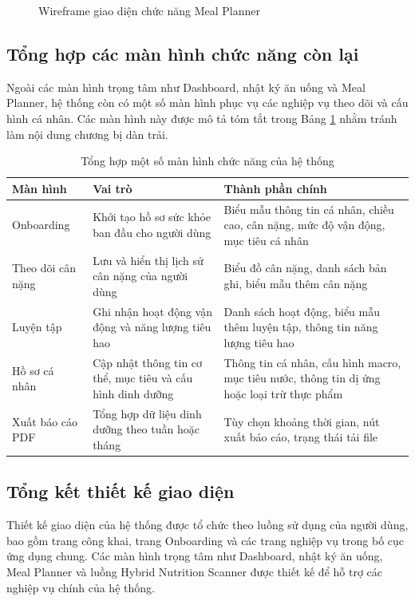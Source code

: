 \documentclass[12pt, a4paper]{report}
\begin{document}
\begin{figure}[htbp]
{\begin{tikzpicture}
    \end{tikzpicture}
    }%
    \caption{Wireframe giao diện chức năng Meal Planner}
    \label{fig:meal_planner_ui}
\end{figure}

\subsection{Tổng hợp các màn hình chức năng còn lại}Ngoài các màn hình trọng tâm như Dashboard, nhật ký ăn uống và Meal Planner, hệ thống còn có một số màn hình phục vụ các nghiệp vụ theo dõi và cấu hình cá nhân. Các màn hình này được mô tả tóm tắt trong Bảng \ref{tab:man_hinh_chuc_nang} nhằm tránh làm nội dung chương bị dàn trải.

\begin{table}[htbp]
\centering
\caption{Tổng hợp một số màn hình chức năng của hệ thống}
\label{tab:man_hinh_chuc_nang}
\begin{tabular}{|>{\raggedright\arraybackslash}p{4cm}|>{\raggedright\arraybackslash}p{4cm}|p{7cm}|}
\hline
\textbf{Màn hình} & \textbf{Vai trò} & \textbf{Thành phần chính} \\
\hline
Onboarding & Khởi tạo hồ sơ sức khỏe ban đầu cho người dùng & Biểu mẫu thông tin cá nhân, chiều cao, cân nặng, mức độ vận động, mục tiêu cá nhân \\
\hline
Theo dõi cân nặng & Lưu và hiển thị lịch sử cân nặng của người dùng & Biểu đồ cân nặng, danh sách bản ghi, biểu mẫu thêm cân nặng \\
\hline
Luyện tập & Ghi nhận hoạt động vận động và năng lượng tiêu hao & Danh sách hoạt động, biểu mẫu thêm luyện tập, thông tin năng lượng tiêu hao \\
\hline
Hồ sơ cá nhân & Cập nhật thông tin cơ thể, mục tiêu và cấu hình dinh dưỡng & Thông tin cá nhân, cấu hình macro, mục tiêu nước, thông tin dị ứng hoặc loại trừ thực phẩm \\
\hline
Xuất báo cáo PDF & Tổng hợp dữ liệu dinh dưỡng theo tuần hoặc tháng & Tùy chọn khoảng thời gian, nút xuất báo cáo, trạng thái tải file \\
\hline
\end{tabular}
\end{table}

\subsection{Tổng kết thiết kế giao diện}Thiết kế giao diện của hệ thống được tổ chức theo luồng sử dụng của người dùng, bao gồm trang công khai, trang Onboarding và các trang nghiệp vụ trong bố cục ứng dụng chung. Các màn hình trọng tâm như Dashboard, nhật ký ăn uống, Meal Planner và luồng Hybrid Nutrition Scanner được thiết kế để hỗ trợ các nghiệp vụ chính của hệ thống.
\end{document}
